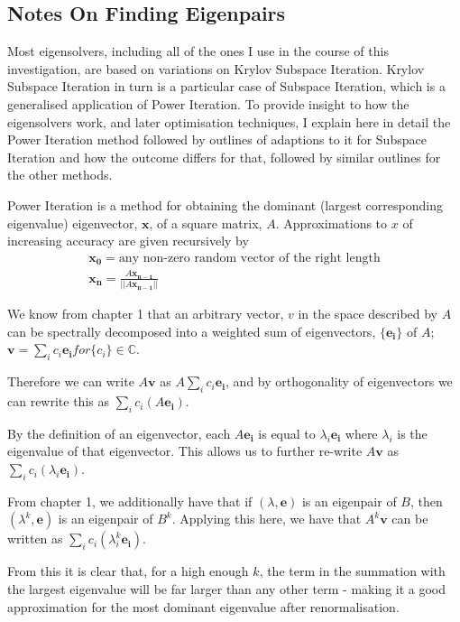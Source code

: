 \subsection{Notes On Finding Eigenpairs}
Most eigensolvers, including all of the ones I use in the course of this investigation, are based on variations on Krylov Subspace Iteration. Krylov Subspace Iteration in turn is a particular case of Subspace Iteration, which is a generalised application of Power Iteration. To provide insight to how the eigensolvers work, and later optimisation techniques, I explain here in detail the Power Iteration method followed by outlines of adaptions to it for Subspace Iteration and how the outcome differs for that, followed by similar outlines for the other methods. 


Power Iteration is a method for obtaining the dominant (largest corresponding eigenvalue) eigenvector, $\mathbf{x}$, of a square matrix, $A$. Approximations to $x$ of increasing accuracy are given recursively by
\begin{align*}
	\mathbf{x_0} = \text{any non-zero random vector of the right length}\\
	\mathbf{x_{n}} = \frac{A\mathbf{x_{n-1}}}{||A\mathbf{x_{n-1}}||}
\end{align*}

We know from chapter 1 that an arbitrary vector, $v$ in the space described by $A$ can be spectrally decomposed into a weighted sum of eigenvectors, $\{\mathbf{e_{i}}\}$ of $A$; $\mathbf{v} = \sum_{i}{c_{i}\mathbf{e_{i}}} for \{c_{i}\} \in \mathbb{C}$.

Therefore we can write $A\mathbf{v}$ as $A\sum_{i}{c_{i}\mathbf{e_{i}}}$, and by orthogonality of eigenvectors we can rewrite this as $\sum_{i}{c_{i}\left(A\mathbf{e_{i}}\right)}$. 

By the definition of an eigenvector, each $A\mathbf{e_i}$ is equal to $\lambda_{i}\mathbf{e_i}$ where $\lambda_i$ is the eigenvalue of that eigenvector. This allows us to further re-write $A\mathbf{v}$ as $\sum_{i}{c_{i}\left(\lambda_{i}\mathbf{e_{i}}\right)}$. 

From chapter 1, we additionally have that if $(\lambda,\mathbf{e})$ is an eigenpair of $B$, then $(\lambda^{k},\mathbf{e})$ is an eigenpair of $B^{k}$. Applying this here, we have that $A^{k}\mathbf{v}$ can be written as $\sum_{i}{c_{i}\left(\lambda_{i}^{k}\mathbf{e_{i}}\right)}$. 

From this it is clear that, for a high enough $k$, the term in the summation with the largest eigenvalue will be far larger than any other term - making it a good approximation for the most dominant eigenvalue after renormalisation. 

